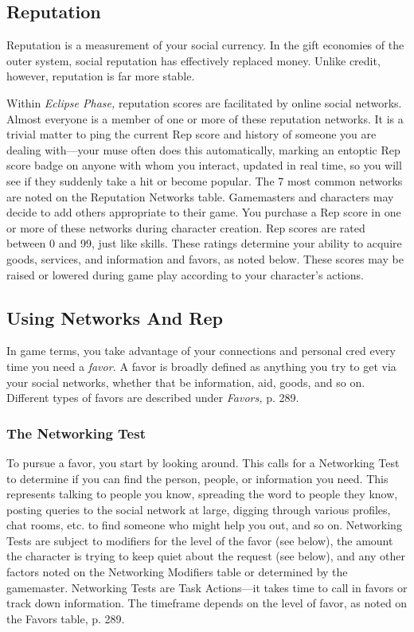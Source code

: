 \subsection{Reputation}

Reputation is a measurement of your social currency. 
In the gift economies of the outer system, social reputation
has effectively replaced money. Unlike credit,
however, reputation is far more stable.

Within \textit{Eclipse Phase,} reputation scores are facilitated
by online social networks. Almost everyone is a
member of one or more of these reputation networks. 
It is a trivial matter to ping the current Rep score and 
history of someone you are dealing with—your muse 
often does this automatically, marking an entoptic 
Rep score badge on anyone with whom you interact, 
updated in real time, so you will see if they suddenly 
take a hit or become popular. The 7 most common 
networks are noted on the Reputation Networks 
table. Gamemasters and characters may decide to add 
others appropriate to their game.
You purchase a Rep score in one or more of these 
networks during character creation. Rep scores are 
rated between 0 and 99, just like skills. These ratings 
determine your ability to acquire goods, services, and 
information and favors, as noted below. These scores 
may be raised or lowered during game play according 
to your character's actions.

\subsection{Using Networks And Rep}

In game terms, you take advantage of your connections
and personal cred every time you need a \textit{favor.}
A favor is broadly defined as anything you try to get 
via your social networks, whether that be information, 
aid, goods, and so on. Different types of favors are 
described under \textit{Favors,} p. 289.

\subsubsection{The Networking Test}

To pursue a favor, you start by looking around. This 
calls for a Networking Test to determine if you can 
find the person, people, or information you need. 
This represents talking to people you know, spreading
the word to people they know, posting queries to
the social network at large, digging through various 
profiles, chat rooms, etc. to find someone who might 
help you out, and so on.
Networking Tests are subject to modifiers for the 
level of the favor (see below), the amount the character
is trying to keep quiet about the request (see
below), and any other factors noted on the Networking
Modifiers table or determined by the gamemaster.
Networking Tests are Task Actions—it takes time 
to call in favors or track down information. The timeframe
depends on the level of favor, as noted on the
Favors table, p. 289.


